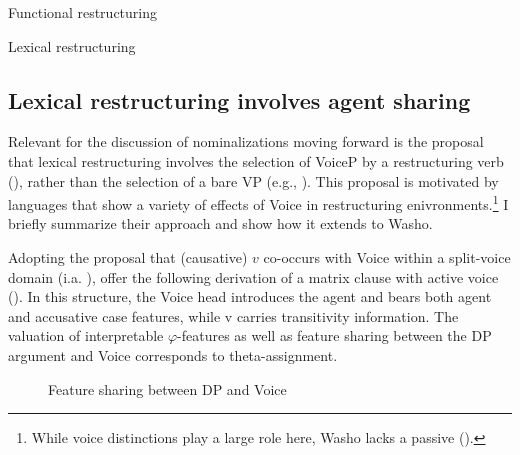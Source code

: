 \documentclass[output=paper]{langscibook}
\begin{document}
\begin{multicols}{2}\raggedcolumns
 \ea Functional restructuring\label{haninkvoice}\\
\z\columnbreak
 \ea Lexical restructuring\label{haninkvoice2}\\
\z 
\end{multicols}

\subsection{Lexical restructuring involves agent sharing}\label{haninksec:agent}

Relevant for the discussion of nominalizations moving forward is the proposal that lexical restructuring involves the selection of VoiceP by a restructuring verb (\citealt{wurmbrand2015,WurmbrandShimamura2017}), rather than the selection of a bare VP (e.g., \citealt{wurmbrand2001,Wurmbrand2004}).
This proposal is motivated by languages that show a variety of effects of Voice in restructuring enivronments.\footnote{While voice distinctions play a large role here, Washo lacks a passive (\citealt{jacobsen1979}).} I briefly summarize their approach and show how it extends to Washo. 

Adopting the proposal that (causative) $v$ co-occurs with Voice within a split-voice domain (i.a. \citealt{bowers2002,folliharley2005,alexiadouetal2006,marantz2008}),  \citet{WurmbrandShimamura2017} offer the following derivation of a matrix clause with active voice (). In this structure, the Voice head introduces the agent and bears both agent and accusative case features, while v carries transitivity information. The valuation of interpretable $\varphi$-features as well as feature sharing between the DP argument and Voice corresponds to theta-assignment.
 
\begin{figure}
\caption{\label{haninkvoice3}Feature sharing between DP and Voice \citep{WurmbrandShimamura2017}}
\end{figure}
\end{document}
